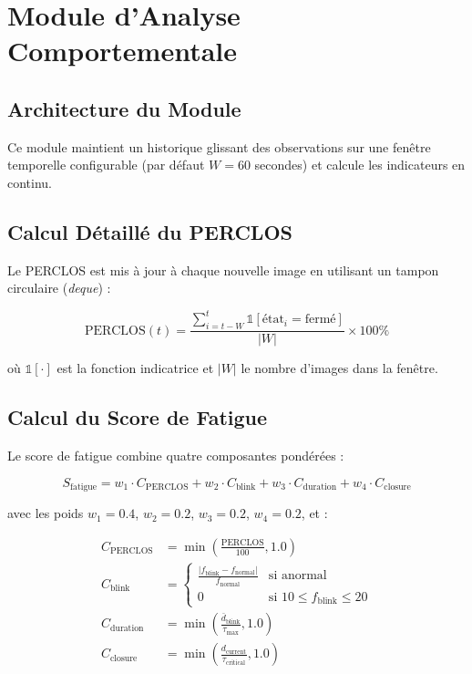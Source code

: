 \documentclass[12pt,a4paper,twoside]{report}
\begin{document}
\section{Module d'Analyse Comportementale}

\subsection{Architecture du Module}

Ce module maintient un historique glissant des observations sur une fenêtre temporelle configurable (par défaut $W = 60$ secondes) et calcule les indicateurs en continu.

\subsection{Calcul Détaillé du PERCLOS}

Le PERCLOS est mis à jour à chaque nouvelle image en utilisant un tampon circulaire (\textit{deque}) :

\begin{equation}
\text{PERCLOS}(t) = \frac{\sum_{i=t-W}^{t} \mathbb{1}[\text{état}_i = \text{fermé}]}{|W|} \times 100\%
\label{eq:perclos_detailed}
\end{equation}

où $\mathbb{1}[\cdot]$ est la fonction indicatrice et $|W|$ le nombre d'images dans la fenêtre.

\subsection{Calcul du Score de Fatigue}

Le score de fatigue combine quatre composantes pondérées :

\begin{equation}
\boxed{
S_{\text{fatigue}} = w_1 \cdot C_{\text{PERCLOS}} + w_2 \cdot C_{\text{blink}} + w_3 \cdot C_{\text{duration}} + w_4 \cdot C_{\text{closure}}
}
\label{eq:fatigue_score}
\end{equation}

avec les poids $w_1 = 0.4$, $w_2 = 0.2$, $w_3 = 0.2$, $w_4 = 0.2$, et :

\begin{align}
C_{\text{PERCLOS}} &= \min\left(\frac{\text{PERCLOS}}{100}, 1.0\right) \label{eq:c_perclos} \\
C_{\text{blink}} &= \begin{cases}
    \frac{|f_{\text{blink}} - f_{\text{normal}}|}{f_{\text{normal}}} & \text{si anormal} \\
    0 & \text{si } 10 \leq f_{\text{blink}} \leq 20
\end{cases} \label{eq:c_blink} \\
C_{\text{duration}} &= \min\left(\frac{\bar{d}_{\text{blink}}}{\tau_{\text{max}}}, 1.0\right) \label{eq:c_duration} \\
C_{\text{closure}} &= \min\left(\frac{d_{\text{current}}}{\tau_{\text{critical}}}, 1.0\right) \label{eq:c_closure}
\end{align}
\end{document}
